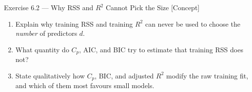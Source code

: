 \documentclass[aspectratio=169,11pt]{beamer}
\begin{document}
\begin{frame}{Exercise 6.2 --- Why RSS and $R^2$ Cannot Pick the Size [Concept]}
  \begin{exercise}
    \begin{enumerate}
      \item Explain why training RSS and training $R^2$ can never be
            used to choose the \emph{number} of predictors $d$.
      \item What quantity do $C_p$, AIC, and BIC try to estimate that
            training RSS does not?
      \item State qualitatively how $C_p$, BIC, and adjusted $R^2$
            modify the raw training fit, and which of them most favours
            small models.
    \end{enumerate}
  \end{exercise}
\end{frame}
\end{document}
